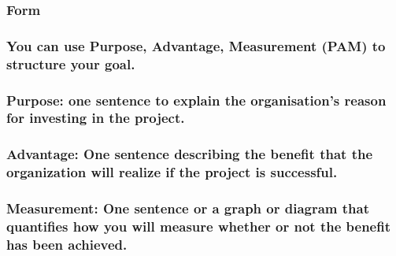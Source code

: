 \documentclass[
]{article}
\begin{document}
\hypertarget{form-1}{%
\subsubsection{Form}\label{form-1}}

\hypertarget{you-can-use-purpose-advantage-measurement-pam-to-structure-your-goal.}{%
\subsubsection{You can use Purpose, Advantage, Measurement (PAM) to
structure your
goal.}\label{you-can-use-purpose-advantage-measurement-pam-to-structure-your-goal.}}

\hypertarget{purpose-one-sentence-to-explain-the-organisations-reason-for-investing-in-the-project.}{%
\subsubsection{Purpose: one sentence to explain the organisation's
reason for investing in the
project.}\label{purpose-one-sentence-to-explain-the-organisations-reason-for-investing-in-the-project.}}

\hypertarget{advantage-one-sentence-describing-the-benefit-that-the-organization-will-realize-if-the-project-is-successful.}{%
\subsubsection{Advantage: One sentence describing the benefit that the
organization will realize if the project is
successful.}\label{advantage-one-sentence-describing-the-benefit-that-the-organization-will-realize-if-the-project-is-successful.}}

\hypertarget{measurement-one-sentence-or-a-graph-or-diagram-that-quantifies-how-you-will-measure-whether-or-not-the-benefit-has-been-achieved.}{%
\subsubsection{Measurement: One sentence or a graph or diagram that
quantifies how you will measure whether or not the benefit has been
achieved.}\label{measurement-one-sentence-or-a-graph-or-diagram-that-quantifies-how-you-will-measure-whether-or-not-the-benefit-has-been-achieved.}}
\end{document}
